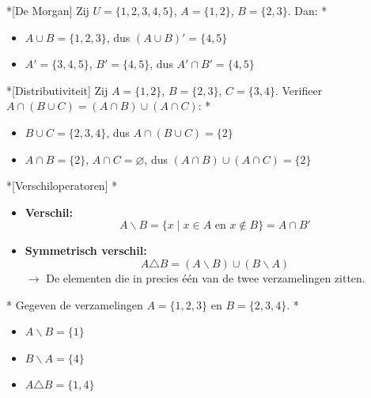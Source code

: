 \begin{niceexample}*[De Morgan]
    Zij $U = \{1,2,3,4,5\}$, $A = \{1,2\}$, $B = \{2,3\}$. Dan:
    \nextpart[]*
    \begin{itemize}
        \item $A \cup B = \{1,2,3\}$, dus $(A \cup B)' = \{4,5\}$
        \item $A' = \{3,4,5\}$, $B' = \{4,5\}$, dus $A' \cap B' = \{4,5\}$ 
    \end{itemize}
\end{niceexample}

\begin{niceexample}*[Distributiviteit]
    Zij $A = \{1,2\}$, $B = \{2,3\}$, $C = \{3,4\}$. Verifieer $A \cap (B \cup C) = (A \cap B) \cup (A \cap C)$:
    \nextpart[Oplossing:]*
    \begin{itemize}
        \item $B \cup C = \{2,3,4\}$, dus $A \cap (B \cup C) = \{2\}$
        \item $A \cap B = \{2\}$, $A \cap C = \varnothing$, dus $(A \cap B) \cup (A \cap C) = \{2\}$ 
    \end{itemize}
\end{niceexample}


\begin{nicedefinition}*[Verschiloperatoren]
    \nextpart[Verschiloperatoren:]*
    \begin{itemize}
        \item \textbf{Verschil:}
        \begin{equation*}
            A \backslash B = \{x \mid x \in A \text{ en } x \notin B\} = A \cap B'
        \end{equation*} 
        \item \textbf{Symmetrisch verschil:}
        \begin{equation*}
            A \triangle B = (A \backslash B) \cup (B \backslash A)
        \end{equation*}
        $\longrightarrow$ De elementen die in precies één van de twee verzamelingen zitten.
    \end{itemize}
\end{nicedefinition}

\begin{niceexample}*
    Gegeven de verzamelingen $A = \{1,2,3\}$ en $B = \{2,3,4\}$.
    \nextpart[Dan:]*
    \begin{itemize}
        \item $A \backslash B = \{1\}$
        \item $B \backslash A = \{4\}$
        \item $A \triangle B = \{1,4\}$
    \end{itemize}
\end{niceexample}

